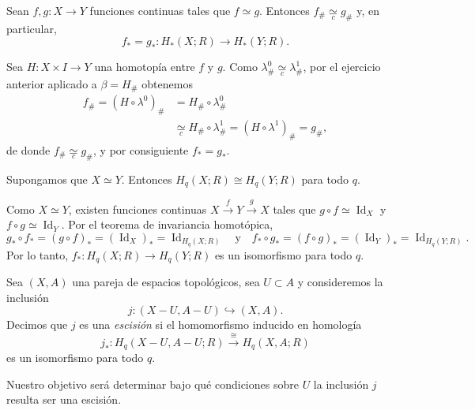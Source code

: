 \begin{coro}
Sean $f, g \colon X \to Y$ funciones continuas tales que $f \simeq g$. Entonces $f_\# \underset{c}{\simeq} g_\#$ y, en particular,
\[
f_* = g_* \colon H_*(X; R) \longrightarrow H_*(Y; R).
\]
\end{coro}

\begin{dem}
Sea $H \colon X \times I \to Y$ una homotopía entre $f$ y $g$. Como $\lambda^0_\# \underset{c}{\simeq} \lambda^1_\#$, por el ejercicio anterior aplicado a $\beta = H_\#$ obtenemos
\begin{align*}
f_\# = (H \circ \lambda^0)_\# &= H_\# \circ \lambda^0_\# \\
&\underset{c}{\simeq} H_\# \circ \lambda^1_\# = (H \circ \lambda^1)_\# = g_\#,
\end{align*}
de donde $f_\# \underset{c}{\simeq} g_\#$, y por consiguiente $f_* = g_*$.
\end{dem}

\begin{coro}
Supongamos que $X \simeq Y$. Entonces $H_q(X; R) \cong H_q(Y; R)$ para todo $q$.
\end{coro}

\begin{dem}
Como $X \simeq Y$, existen funciones continuas $X \xrightarrow{f} Y \xrightarrow{g} X$ tales que $g \circ f \simeq \operatorname{Id}_X$ y $f \circ g \simeq \operatorname{Id}_Y$. Por el teorema de invariancia homotópica,
\[
g_* \circ f_* = (g \circ f)_* = (\operatorname{Id}_X)_* = \operatorname{Id}_{H_q(X; R)}
\quad \text{y} \quad
f_* \circ g_* = (f \circ g)_* = (\operatorname{Id}_Y)_* = \operatorname{Id}_{H_q(Y; R)}.
\]
Por lo tanto, $f_* \colon H_q(X; R) \to H_q(Y; R)$ es un isomorfismo para todo $q$.
\end{dem}

\begin{definicion}[Escisión]
Sea $(X, A)$ una pareja de espacios topológicos, sea $U \subset A$ y consideremos la inclusión
\[
j \colon (X - U, A - U) \hookrightarrow (X, A).
\]
Decimos que $j$ es una \textit{escisión} si el homomorfismo inducido en homología
\[
j_* \colon H_q(X - U, A - U; R) \xrightarrow{\;\cong\;} H_q(X, A; R)
\]
es un isomorfismo para todo $q$.
\end{definicion}

Nuestro objetivo será determinar bajo qué condiciones sobre $U$ la inclusión $j$ resulta ser una escisión.

